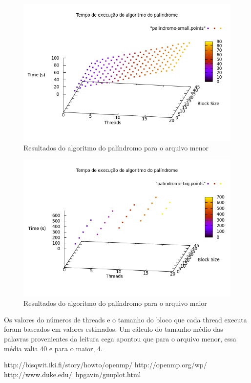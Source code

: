\documentclass[a4paper]{article}
\begin{document}
\begin{figure}[float=h]
	\begin{center}
		\includegraphics[scale=0.5]{palindrome-small}
	\end{center}
	\caption{Resultados do algoritmo do palíndromo para o arquivo menor}
	\label{palindrome-small}
\end{figure}
\begin{figure}[float=h]
	\begin{center}
		\includegraphics[scale=0.5]{palindrome-big}
	\end{center}
	\caption{Resultados do algoritmo do palíndromo para o arquivo maior}
	\label{palindrome-big}
\end{figure}

Os valores do números de threads e o tamanho do bloco que cada thread executa foram baseados em valores estimados. Um cálculo do tamanho médio das palavras provenientes da leitura cega apontou que para o arquivo menor, essa média valia 40 e para o maior, 4.

\begin{thebibliography}{99}
	http://bisqwit.iki.fi/story/howto/openmp/
	http://openmp.org/wp/
	http://www.duke.edu/~hpgavin/gnuplot.html
\end{thebibliography}
\end{document}
